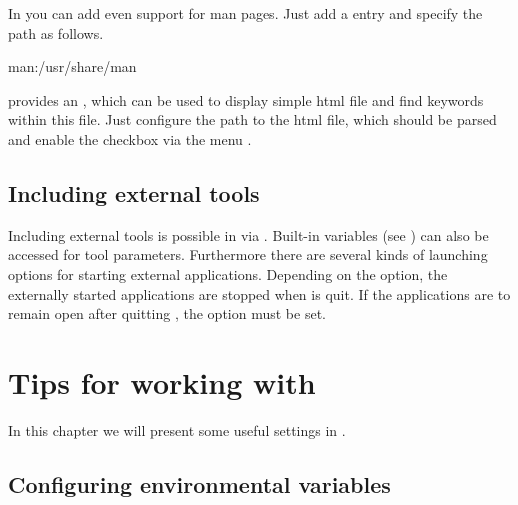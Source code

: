 
In \codeblocks you can add even support for man pages. Just add a entry  and specify the path as follows.

\begin{cmd}
man:/usr/share/man
\end{cmd}

\codeblocks provides an , which can be used to display simple html file and find keywords within this file. Just configure the path to the html file, which should be parsed and enable the checkbox  via the menu .


%

\subsection{Including external tools}

Including external tools is possible in \codeblocks via . Built-in variables (see ) can also be accessed for tool parameters. Furthermore there are several kinds of launching options for starting external applications. Depending on the option, the externally started applications are stopped when \codeblocks is quit. If the applications are to remain open after quitting \codeblocks, the option  must be set.

\section{Tips for working with \codeblocks}

In this chapter we will present some useful settings in \codeblocks.

\subsection{Configuring environmental variables}

